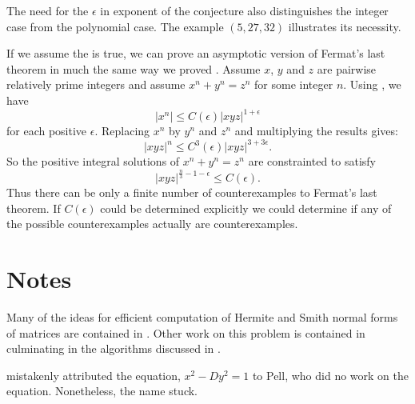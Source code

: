 The need for the $\epsilon$ in exponent of the conjecture also
distinguishes the integer case from the polynomial case.  The example
$(5, 27, 32)$ illustrates its necessity.

If we assume the {\ABCconj} is true, we can prove an asymptotic
version of Fermat's last theorem in much the same way we proved
.  Assume $x$, $y$ and $z$ are pairwise
relatively prime integers and assume $x^n + y^n = z^n$ for some
integer $n$.  Using , we have
\[
|x^n| \le C(\epsilon) |xyz|^{1+\epsilon} 
\]
for each positive $\epsilon$.
Replacing $x^n$ by $y^n$ and $z^n$ and multiplying the results gives:
\[
|xyz|^n \le C^3(\epsilon) |xyz|^{3+3\epsilon}.
\]
So the positive integral solutions of $x^n + y^n = z^n$ are
constrainted to satisfy
\[
|xyz|^{\frac{n}{3}-1-\epsilon} \le C(\epsilon).
\]
Thus there can be only a finite number of counterexamples to Fermat's
last theorem.  If $C(\epsilon)$ could be determined explicitly we
could determine if any of the possible counterexamples actually are
counterexamples.  


\section*{Notes}

\small


  Many of the ideas for efficient
computation of Hermite and Smith normal forms of matrices are
contained in \cite{Havas79}.  Other work on this problem is contained
in \cite{Bradley71,Kannan79,Chou:Collins82,Domich85} culminating in
the algorithms discussed in \cite{Iliopoulos89a,Iliopoulos89b}.

 {\Lagrange} mistakenly attributed the
equation, $x^2 - Dy^2 = 1$ to Pell, who did no work on the equation.
Nonetheless, the name stuck.

